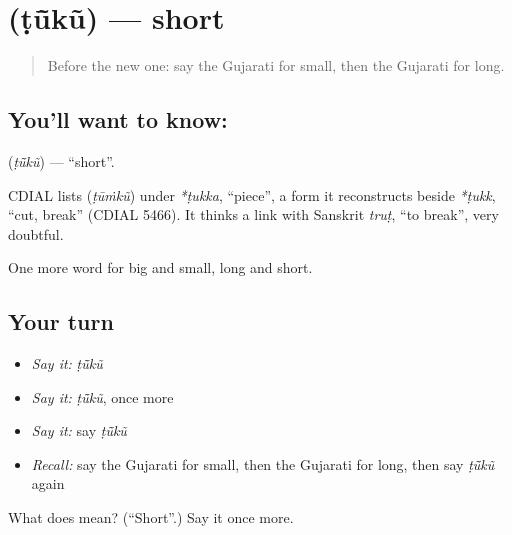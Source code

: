 \section[\texorpdfstring{\gu{ટૂંકું} (ṭū̃kũ)}{ટૂંકું (ṭū̃kũ)}]{ (ṭū̃kũ) — short}

\label{lesson:GU-C72-short}



\begin{quote}
Before the new one: say the Gujarati for small, then the Gujarati for long.
\end{quote}

\subsection*{You'll want to know: }
\textbf{} (\emph{ṭū̃kũ}) — \textquotedblleft{}short\textquotedblright{}.

\begin{cousinweb}
CDIAL lists \textbf{} (\emph{ṭūṁkũ}) under \emph{*ṭukka}, \textquotedblleft{}piece\textquotedblright{}, a form it reconstructs beside \emph{*ṭukk}, \textquotedblleft{}cut, break\textquotedblright{} (CDIAL 5466). It thinks a link with Sanskrit \emph{truṭ}, \textquotedblleft{}to break\textquotedblright{}, very doubtful.
\end{cousinweb}

\begin{grammarlens}[title={What you've built}]
One more word for big and small, long and short.
\end{grammarlens}

\subsection*{Your turn}
\begin{itemize}
\raggedright
  \item \emph{Say it:} \emph{ṭū̃kũ}
  \item \emph{Say it:} \emph{ṭū̃kũ}, once more
  \item \emph{Say it:} say \emph{ṭū̃kũ}
  \item \emph{Recall:} say the Gujarati for small, then the Gujarati for long, then say \emph{ṭū̃kũ} again
\end{itemize}

\begin{tcolorbox}[breakable,colback=teal!4,colframe=teal!35!black,title={Before you move on}]
What does  mean? (\textquotedblleft{}Short\textquotedblright{}.) Say it once more.
\end{tcolorbox}

